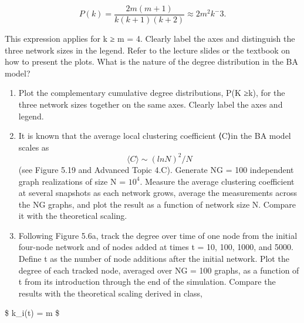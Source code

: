 \documentclass[11pt]{article}
\begin{document}
\[P(k) = \frac{2m(m + 1)}{k(k + 1)(k + 2)} ≈ 2m^2k^−3.\]

This expression applies for k ≥ m = 4. Clearly label the axes and
distinguish the three network sizes in the legend. Refer to the lecture
slides or the textbook on how to present the plots. What is the nature
of the degree distribution in the BA model?

\begin{enumerate}
\def\labelenumi{(\alph{enumi})}
\setcounter{enumi}{2}
\item
  Plot the complementary cumulative degree distributions, P(K ≥k), for
  the three network sizes together on the same axes. Clearly label the
  axes and legend.
\item
  It is known that the average local clustering coefficient ⟨C⟩in the BA
  model scales as \[⟨C⟩∼(ln N)^2/N\] (see Figure 5.19 and Advanced Topic
  4.C). Generate NG = 100 independent graph realizations of size N =
  \(10^4\). Measure the average clustering coefficient at several
  snapshots as each network grows, average the measurements across the
  NG graphs, and plot the result as a function of network size N.
  Compare it with the theoretical scaling.
\item
  Following Figure 5.6a, track the degree over time of one node from the
  initial four-node network and of nodes added at times t = 10, 100,
  1000, and 5000. Define t as the number of node additions after the
  initial network. Plot the degree of each tracked node, averaged over
  NG = 100 graphs, as a function of t from its introduction through the
  end of the simulation. Compare the results with the theoretical
  scaling derived in class,
\end{enumerate}

\$ k\_i(t) = m \$
\end{document}
